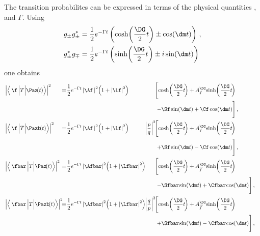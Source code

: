 The transition probabilites can be expressed in terms of the physical quantities \dm, \DG and $\Gamma$.
Using
\begin{align}
g_{\pm}g_{\pm}^{*} &= \frac{1}{2}e^{-\Gamma t}\left(\cosh\!\left(\frac{\DG}{2}t\right)\pm\cos\!\left(\dm t\right)\right)\,,\\
g_{\pm}^*g_{\mp} &=  \frac{1}{2}e^{-\Gamma t}\left(\sinh\!\left(\frac{\DG}{2}t\right)\pm i\sin\!\left(\dm t\right)\right)
\end{align}
one obtains
\begin{align}
&\left|\left<\,\f\,\Big|T\Big|\Paz\!(t)\right>\right|^2\!\!\!\!\!\!\!&=
&\kern 1pt {\frac{1}{2}e^{-\Gamma t}\left|\Af\,\right|^2\!\left(1+\left|\Lf\right|^2\right)}& &&
&\kern -11.0pt{\Bigg[\!\cosh\!\left(\frac{\DG}{2}t\!\right) + A_f^{\DG}\!\sinh\!\left(\frac{\DG}{2}t\!\right)}&\nonumber\\
&& && && &\kern -7.5pt{-\Sf\sin\!\left(\dm t\right)+\Cf\cos\!\left(\dm t\right)\!\Bigg]}\,,&\label{eq:Ptof}\\
&\left|\left<\,\f\,\Big|T\Big|\Pazb\!(t)\right>\right|^2\!\!\!\!\!\!\!&=
&\kern 1pt {\frac{1}{2}e^{-\Gamma t}\left|\Af\,\right|^2\!\left(1+\left|\Lf\right|^2\right)}& &\kern -10.5pt{\left|\frac{p}{q}\right|^2}&
&\kern -11.0pt{\Bigg[\!\cosh\!\left(\frac{\DG}{2}t\!\right) + A_f^{\DG}\!\sinh\!\left(\frac{\DG}{2}t\!\right)}&\nonumber\\
&& && && &\kern -7.5pt{+\Sf\sin\!\left(\dm t\right)-\Cf\cos\!\left(\dm t\right)\!\Bigg]}\,,&\label{eq:Pbartof}\\
&\left|\left<\,\fbar\,\Big|T\Big|\Paz\!(t)\right>\right|^2\!\!\!\!\!\!\!&=
&\kern 1pt {\frac{1}{2}e^{-\Gamma t}\left|\Afbar\right|^2\!\left(1+\left|\Lfbar\right|^2\right)}& &&
&\kern -11.0pt{\Bigg[\!\cosh\!\left(\frac{\DG}{2}t\!\right) + A_{\kern 1.5pt\overline{\kern -1.5pt f\kern 1.5pt}}^{\DG}\!\sinh\!\left(\frac{\DG}{2}t\!\right)}&\nonumber\\
&& && && &\kern -7.5pt{-\Sfbar\kern -0.1em\sin\!\left(\dm t\right)+\Cfbar\kern -0.1em\cos\!\left(\dm t\right)\!\Bigg]}\,,&\label{eq:Ptofbar}\\
&\left|\left<\,\fbar\,\Big|T\Big|\Pazb\!(t)\right>\right|^2\!\!\!\!\!\!\!&=
&\kern 1pt {\frac{1}{2}e^{-\Gamma t}\left|\Afbar\right|^2\!\left(1+\left|\Lfbar\right|^2\right)}& &\kern -10.5pt{\left|\frac{q}{p}\right|^2}&
&\kern -11.0pt{\Bigg[\!\cosh\!\left(\frac{\DG}{2}t\!\right) + A_{\kern 1.5pt\overline{\kern -1.5pt f\kern 1.5pt}}^{\DG}\!\sinh\!\left(\frac{\DG}{2}t\!\right)}&\nonumber\\
&& && && &\kern -7.5pt{+\Sfbar\kern -0.1em \sin\!\left(\dm t\right)-\Cfbar\kern -0.1em\cos\!\left(\dm t\right)\!\Bigg]}\,,&\label{eq:Pbartofbar}
\end{align}
